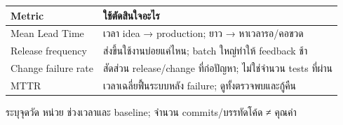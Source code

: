 {\smalltable\begin{tabularx}{\linewidth}{|p{14mm}|Y|}\hline
{}Metric & ใช้ตัดสินใจอะไร\\\hline
Mean Lead Time & เวลา idea → production; ยาว → หาเวลารอ/คอขวด\\\hline
Release frequency & ส่งขึ้นใช้งานบ่อยแค่ไหน; batch ใหญ่ทำให้ feedback ช้า\\\hline
Change failure rate & สัดส่วน release/change ที่ก่อปัญหา; ไม่ใช่จำนวน tests ที่ผ่าน\\\hline
MTTR & เวลาเฉลี่ยฟื้นระบบหลัง failure; ดูทั้งตรวจพบและกู้คืน\\\hline
\end{tabularx}}
\extra ระบุจุดวัด หน่วย ช่วงเวลาและ baseline; จำนวน commits/บรรทัดโค้ด ≠ คุณค่า
